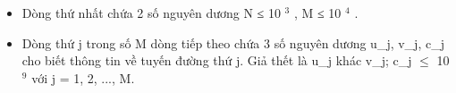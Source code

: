 \begin{itemize}
	\item     Dòng thứ nhất chứa 2 số nguyên dương N ≤ 10    $^     3    $    , M         ≤ 10     $^      4     $     .    
	\item      Dòng thứ j trong số M dòng tiếp theo chứa 3 số nguyên dương u\_j, v\_j, c\_j cho biết thông tin về tuyến đường thứ j. Giả thết là u\_j khác v\_j; c\_j  $\le$  10     $^      9     $     với j = 1, 2, ..., M.    
\end{itemize}

\